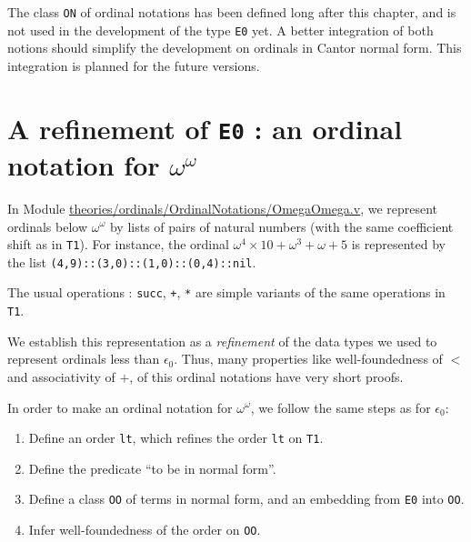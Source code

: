     \begin{project}
    The class \texttt{ON} of ordinal notations has been defined long after this 
    chapter, and is not used in the development of the type \texttt{E0} yet.
    A better integration of both notions should simplify the development on ordinals in Cantor normal form. This integration is planned for the future versions.

    \end{project}

 

    \section{A refinement of \texttt{E0} : an ordinal notation for \texorpdfstring{$\omega^\omega$}{omega\^omega}}

    In Module   \href{https://github.com/coq-community/hydra-battles/blob/master/theories/ordinals/OrdinalNotations/OmegaOmega.v}{theories/ordinals/OrdinalNotations/OmegaOmega.v},
    we represent ordinals below $\omega^\omega$ by lists of pairs of natural numbers (with the same coefficient shift as in \texttt{T1}).
    For instance, the ordinal $\omega^4\times 10 + \omega^3 + \omega+ 5$ is represented by the list \texttt{(4,9)::(3,0)::(1,0)::(0,4)::nil}.

    
    
  The usual operations : \texttt{succ}, \texttt{+}, \texttt{*} are simple variants of the same operations in \texttt{T1}.

  
    We establish this representation as a \emph{refinement} of the data types we used to represent ordinals less than $\epsilon_0$. Thus, many properties like well-foundedness of $<$ and associativity of $+$,  of this ordinal notations have very short proofs.


    In order to make an ordinal notation for $\omega^\omega$, we follow the same steps as for $\epsilon_0$:
    \begin{enumerate}
    \item Define an order \texttt{lt}, which refines the order
      \texttt{lt} on \texttt{T1}.
      
    \item Define the predicate ``to be in normal form''.
    \item Define a class \texttt{OO} of terms in normal form, and an embedding from \texttt{E0} into \texttt{OO}.
      \item Infer well-foundedness of the order on \texttt{OO}.
      
    \end{enumerate}

